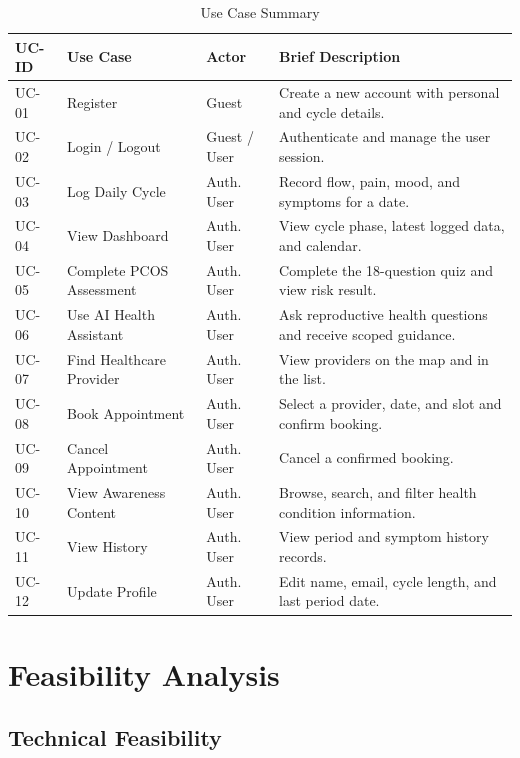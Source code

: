 \begin{table}[h!]
\centering
\caption{Use Case Summary}
\label{tab:usecases}
\renewcommand{\arraystretch}{1.4}
\begin{tabular}{|p{1.2cm}|p{4cm}|p{2cm}|p{5.5cm}|}
\hline
\rowcolor[HTML]{D9D9D9}
\textbf{UC-ID} & \textbf{Use Case} & \textbf{Actor} & \textbf{Brief Description} \\
\hline
UC-01 & Register & Guest & Create a new account with personal and cycle details. \\
\hline
UC-02 & Login / Logout & Guest / User & Authenticate and manage the user session. \\
\hline
UC-03 & Log Daily Cycle & Auth. User & Record flow, pain, mood, and symptoms for a date. \\
\hline
UC-04 & View Dashboard & Auth. User & View cycle phase, latest logged data, and calendar. \\
\hline
UC-05 & Complete PCOS Assessment & Auth. User & Complete the 18-question quiz and view risk result. \\
\hline
UC-06 & Use AI Health Assistant & Auth. User & Ask reproductive health questions and receive scoped guidance. \\
\hline
UC-07 & Find Healthcare Provider & Auth. User & View providers on the map and in the list. \\
\hline
UC-08 & Book Appointment & Auth. User & Select a provider, date, and slot and confirm booking. \\
\hline
UC-09 & Cancel Appointment & Auth. User & Cancel a confirmed booking. \\
\hline
UC-10 & View Awareness Content & Auth. User & Browse, search, and filter health condition information. \\
\hline
UC-11 & View History & Auth. User & View period and symptom history records. \\
\hline
UC-12 & Update Profile & Auth. User & Edit name, email, cycle length, and last period date. \\
\hline
\end{tabular}
\end{table}

\section{Feasibility Analysis}
\label{sec:feasibility}

\subsection{Technical Feasibility}

